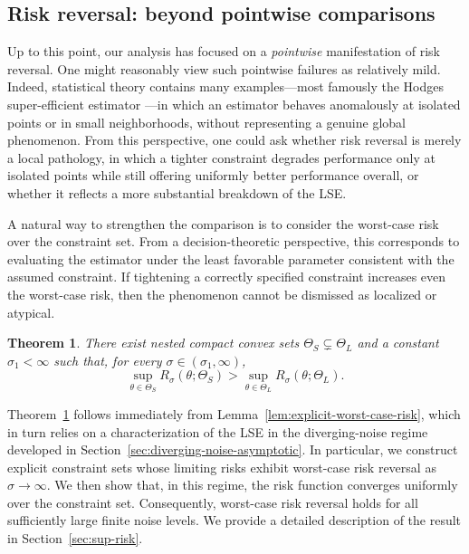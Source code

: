 \documentclass[11pt]{article}
\theoremstyle{plain}
\newtheorem{theorem}{Theorem}[section]
\theoremstyle{definition}
\begin{document}
\subsection{Risk reversal: beyond pointwise comparisons}

Up to this point, our analysis has focused on a \emph{pointwise} manifestation of risk reversal. One might reasonably view such pointwise failures as relatively mild. Indeed, statistical theory contains many examples---most famously the Hodges super-efficient estimator \cite[Chapter 8]{van2000asymptotic}---in which an estimator behaves anomalously at isolated points or in small neighborhoods, without representing a genuine global phenomenon. From this perspective, one could ask whether risk reversal is merely a local pathology, in which a tighter constraint degrades performance only at isolated points while still offering uniformly better performance overall, or whether it reflects a more substantial breakdown of the LSE.

A natural way to strengthen the comparison is to consider the worst-case risk over the constraint set. From a decision-theoretic perspective, this corresponds to evaluating the estimator under the least favorable parameter consistent with the assumed constraint. If tightening a correctly specified constraint increases even the worst-case risk, then the phenomenon cannot be dismissed as localized or atypical.

\begin{theorem}\label{thm:worst-case-risk-reversal}
There exist nested compact convex sets $\Theta_S \subsetneq \Theta_L$ and a constant $\sigma_1 < \infty$ such that, for every $\sigma \in (\sigma_1, \infty)$,
\[
\sup_{\theta \in \Theta_S} R_\sigma(\theta; \Theta_S)
>
\sup_{\theta \in \Theta_L} R_\sigma(\theta; \Theta_L).
\]
\end{theorem}

Theorem~\ref{thm:worst-case-risk-reversal} follows immediately from Lemma~\ref{lem:explicit-worst-case-risk}, which in turn relies on a characterization of the LSE in the diverging-noise regime developed in Section~\ref{sec:diverging-noise-asymptotic}. In particular, we construct explicit constraint sets whose limiting risks exhibit worst-case risk reversal as $\sigma \to \infty$. We then show that, in this regime, the risk function converges uniformly over the constraint set. Consequently, worst-case risk reversal holds for all sufficiently large finite noise levels. We provide a detailed description of the result in Section~\ref{sec:sup-risk}.
\end{document}
